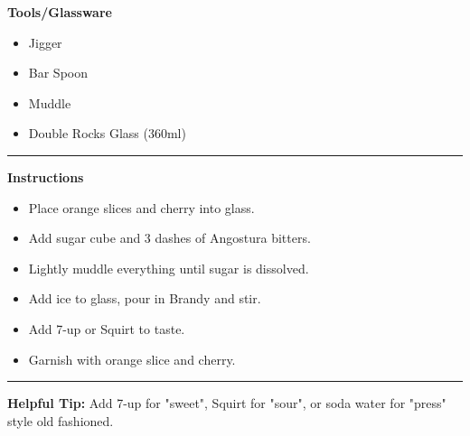 \hspace{.01\textwidth}\vrule\hspace{.01\textwidth}
\begin{minipage}[t]{.49\textwidth}
    \noindent
    \textbf{\large Tools/Glassware}
    \begin{itemize}
        \item Jigger
        \item Bar Spoon
        \item Muddle
        \item Double Rocks Glass (360ml)
    \end{itemize}
\end{minipage}
\vspace{.5em}\hrule\vspace{.5em}
\noindent
\begin{minipage}{\textwidth}
    \noindent
    \textbf{\large Instructions}
    \begin{itemize}
        \item Place orange slices and cherry into glass.
        \item Add sugar cube and 3 dashes of Angostura bitters.
        \item Lightly muddle everything until sugar is dissolved.
        \item Add ice to glass, pour in Brandy and stir.
        \item Add 7-up or Squirt to taste.
        \item Garnish with orange slice and cherry.
    \end{itemize}
\end{minipage}
\vspace{.5em}\hrule\vspace{.5em}
\noindent
\textbf{\large Helpful Tip:} Add 7-up for "sweet", Squirt for "sour", or soda water for "press" style old fashioned.
\newpage
